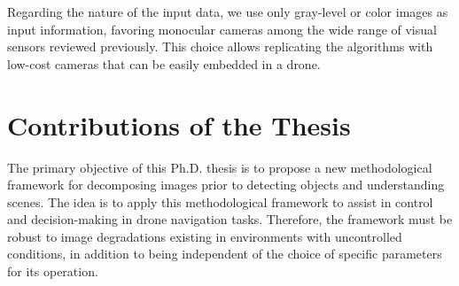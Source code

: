 Regarding the nature of the input data, we use only gray-level or color images as input information, favoring monocular cameras among the wide range of visual sensors reviewed previously. This choice allows replicating the algorithms with low-cost cameras that can be easily embedded in a drone.


\section*{Contributions of the Thesis}\label{sec:objectives_of_the_thesis}


The primary objective of this Ph.D. thesis is to propose a new methodological framework for decomposing images prior to detecting objects and understanding scenes. The idea is to apply this methodological framework to assist in control and decision-making in drone navigation tasks. Therefore, the framework must be robust to image degradations existing in environments with uncontrolled conditions, in addition to being independent of the choice of specific parameters for its operation.

